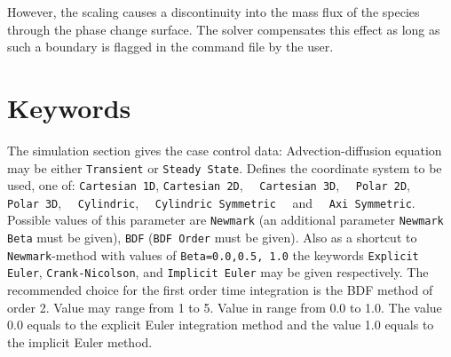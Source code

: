 \begin{versiona}
However, the scaling causes a discontinuity into the mass flux of the
species through the phase change surface. The solver compensates this
effect as long as such a boundary is flagged in the command file by
the user.


\section{Keywords} 
\end{versiona}

\sifbegin
{}
The simulation section gives the case control data:
\sifbegin
{} Advection-diffusion equation may be either 
{\tt Transient} or {\tt Steady State}.
 Defines the coordinate system to be used, one of:
{\tt Cartesian 1D}, {\tt Cartesian 2D},~~ {\tt Cartesian 3D},~~ {\tt Polar 2D},~~
 {\tt Polar 3D},~~ {\tt Cy\-lin\-dric},~~ {\tt Cylindric Symmetric}
~~and~~ {\tt Axi Symmetric}.
Possible values of this parameter are {\tt Newmark} (an additional
parameter {\tt Newmark Beta} must be given), {\tt BDF} ({\tt BDF Order} must be given). Also as a
shortcut to {\tt Newmark}-method with values of {\tt Beta=0.0,0.5, 1.0} the keywords 
{\tt Explicit Euler}, {\tt Crank-Nicolson}, and {\tt Implicit Euler} may be given respectively.
The recommended choice for the first order time integration is the BDF method of order 2.
Value may range from 1 to 5.
 Value in range from 0.0 to 1.0. The value 0.0 equals to
the explicit Euler integration method and the value 1.0 equals to the implicit Euler method. 
\sifend

